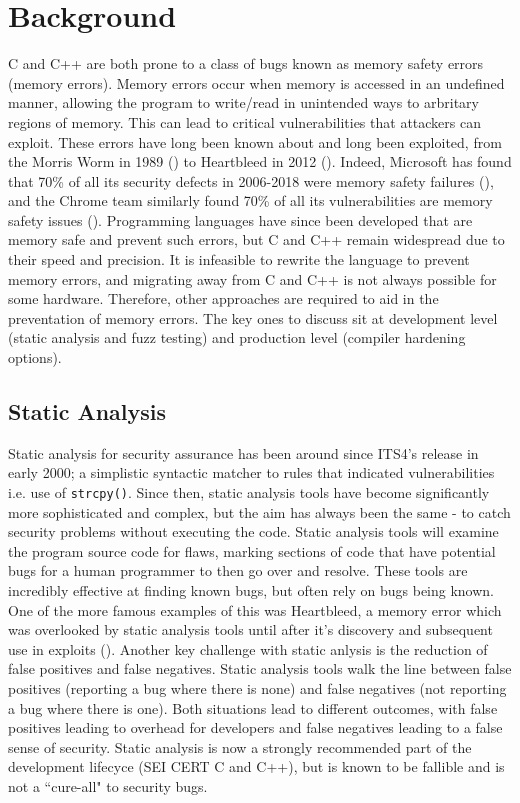 \chapter{Background}\label{sec:background}

C and C++ are both prone to a class of bugs known as memory safety errors (memory errors). 
Memory errors occur when memory is accessed in an undefined manner, allowing the program to write/read in unintended ways to arbritary regions of memory.
This can lead to critical vulnerabilities that attackers can exploit. 
These errors have long been known about and long been exploited, from the Morris Worm in 1989 (\cite{don1989morris}) to Heartbleed in 2012 (\cite{giac2014heartbleed}).
Indeed, Microsoft has found that 70\% of all its security defects in 2006-2018 were memory safety failures  (\cite{microsoft70}), and the Chrome team similarly found 70\% of all its vulnerabilities are memory safety issues  (\cite{chrome70}).  %
Programming languages have since been developed that are memory safe and prevent such errors, but C and C++ remain widespread due to their speed and precision. 
It is infeasible to rewrite the language to prevent memory errors, and migrating away from C and C++ is not always possible for some hardware. 
Therefore, other approaches are required to aid in the preventation of memory errors. 
The key ones to discuss sit at development level (static analysis and fuzz testing) and production level (compiler hardening options).

\section{Static Analysis}

Static analysis for security assurance has been around since ITS4's release in early 2000; a simplistic syntactic matcher to rules that indicated vulnerabilities i.e. use of \texttt{strcpy()}\cite{??}.
Since then, static analysis tools have become significantly more sophisticated and complex, but the aim has always been the same - to catch security problems without executing the code. 
Static analysis tools will examine the program source code for flaws, marking sections of code that have potential bugs for a human programmer to then go over and resolve. 
These tools are incredibly effective at finding known bugs, but often rely on bugs being known. 
One of the more famous examples of this was Heartbleed, a memory error which was overlooked by static analysis tools until after it's discovery and subsequent use in exploits (\cite{giac2014heartbleed}).
Another key challenge with static anlysis is the reduction of false positives and false negatives. 
Static analysis tools walk the line between false positives (reporting a bug where there is none) and false negatives (not reporting a bug where there is one). 
Both situations lead to different outcomes, with false positives leading to overhead for developers and false negatives leading to a false sense of security. 
Static analysis is now a strongly recommended part of the development lifecyce (SEI CERT C and C++), but is known to be fallible and is not a ``cure-all" to security bugs.

